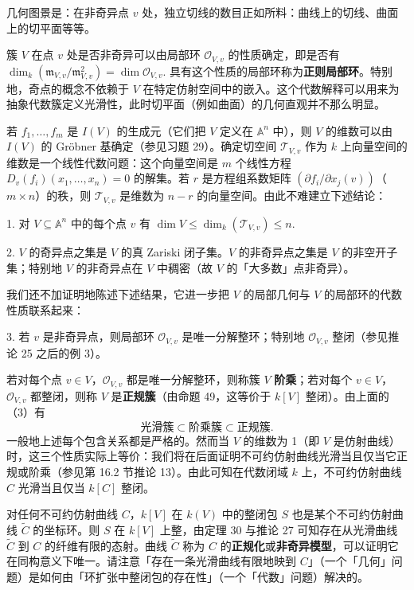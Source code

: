 几何图景是：在非奇异点 \(v\) 处，独立切线的数目正如所料：曲线上的切线、曲面上的切平面等等。

簇 \(V\) 在点 \(v\) 处是否非奇异可以由局部环 \(\mathcal{O}_{V,v}\) 的性质确定，即是否有 \(\dim_k(\mathfrak{m}_{V,v}/\mathfrak{m}_{V,v}^2) = \dim\mathcal{O}_{V,v}\). 具有这个性质的局部环称为\textbf{正则局部环}。特别地，奇点的概念不依赖于 \(V\) 在特定仿射空间中的嵌入。这个代数解释可以用来为抽象代数簇定义光滑性，此时切平面（例如曲面）的几何直观并不那么明显。

若 \(f_1, \ldots, f_m\) 是 \(I(V)\) 的生成元（它们把 \(V\) 定义在 \(\mathbb{A}^n\) 中），则 \(V\) 的维数可以由 \(I(V)\) 的 Gröbner 基确定（参见习题 29）。确定切空间 \(\mathcal{T}_{V,v}\) 作为 \(k\) 上向量空间的维数是一个线性代数问题：这个向量空间是 \(m\) 个线性方程 \(D_v(f_i)(x_1, \ldots, x_n) = 0\) 的解集。若 \(r\) 是方程组系数矩阵 \((\partial f_i/\partial x_j(v))\)（\(m \times n\)）的秩，则 \(\mathcal{T}_{V,v}\) 是维数为 \(n-r\) 的向量空间。由此不难建立下述结论：

1. 对 \(V \subseteq \mathbb{A}^n\) 中的每个点 \(v\) 有 \(\dim V \leq \dim_k(\mathcal{T}_{V,v}) \leq n\).

2. \(V\) 的奇异点之集是 \(V\) 的真 Zariski 闭子集。\(V\) 的非奇异点之集是 \(V\) 的非空开子集；特别地 \(V\) 的非奇异点在 \(V\) 中稠密（故 \(V\) 的「大多数」点非奇异）。

我们还不加证明地陈述下述结果，它进一步把 \(V\) 的局部几何与 \(V\) 的局部环的代数性质联系起来：

3. 若 \(v\) 是非奇异点，则局部环 \(\mathcal{O}_{V,v}\) 是唯一分解整环；特别地 \(\mathcal{O}_{V,v}\) 整闭（参见推论 25 之后的例 3）。

若对每个点 \(v \in V\)，\(\mathcal{O}_{V,v}\) 都是唯一分解整环，则称簇 \(V\) \textbf{阶乘}；若对每个 \(v \in V\)，\(\mathcal{O}_{V,v}\) 都整闭，则称 \(V\) 是\textbf{正规簇}（由命题 49，这等价于 \(k[V]\) 整闭）。由上面的（3）有
\[
\text{光滑簇} \subset \text{阶乘簇} \subset \text{正规簇}.
\]
一般地上述每个包含关系都是严格的。然而当 \(V\) 的维数为 1（即 \(V\) 是仿射曲线）时，这三个性质实际上等价：我们将在后面证明不可约仿射曲线光滑当且仅当它正规或阶乘（参见第 16.2 节推论 13）。由此可知在代数闭域 \(k\) 上，不可约仿射曲线 \(C\) 光滑当且仅当 \(k[C]\) 整闭。

对任何不可约仿射曲线 \(C\)，\(k[V]\) 在 \(k(V)\) 中的整闭包 \(S\) 也是某个不可约仿射曲线 \(\tilde C\) 的坐标环。则 \(S\) 在 \(k[V]\) 上整，由定理 30 与推论 27 可知存在从光滑曲线 \(\tilde C\) 到 \(C\) 的纤维有限的态射。曲线 \(\tilde C\) 称为 \(C\) 的\textbf{正规化}或\textbf{非奇异模型}，可以证明它在同构意义下唯一。请注意「存在一条光滑曲线有限地映到 \(C\)」（一个「几何」问题）是如何由「环扩张中整闭包的存在性」（一个「代数」问题）解决的。

